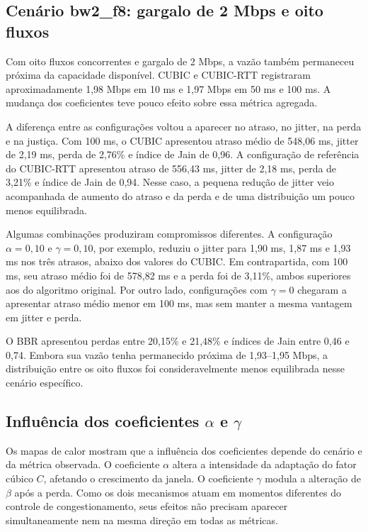 \subsection{Cenário bw2\_f8: gargalo de 2 Mbps e oito fluxos}

Com oito fluxos concorrentes e gargalo de 2 Mbps, a vazão também permaneceu próxima da capacidade disponível. CUBIC e CUBIC-RTT registraram aproximadamente 1,98 Mbps em 10 ms e 1,97 Mbps em 50 ms e 100 ms. A mudança dos coeficientes teve pouco efeito sobre essa métrica agregada.

A diferença entre as configurações voltou a aparecer no atraso, no jitter, na perda e na justiça. Com 100 ms, o CUBIC apresentou atraso médio de 548,06 ms, jitter de 2,19 ms, perda de 2,76\% e índice de Jain de 0,96. A configuração de referência do CUBIC-RTT apresentou atraso de 556,43 ms, jitter de 2,18 ms, perda de 3,21\% e índice de Jain de 0,94. Nesse caso, a pequena redução de jitter veio acompanhada de aumento do atraso e da perda e de uma distribuição um pouco menos equilibrada.

Algumas combinações produziram compromissos diferentes. A configuração $\alpha=0{,}10$ e $\gamma=0{,}10$, por exemplo, reduziu o jitter para 1,90 ms, 1,87 ms e 1,93 ms nos três atrasos, abaixo dos valores do CUBIC. Em contrapartida, com 100 ms, seu atraso médio foi de 578,82 ms e a perda foi de 3,11\%, ambos superiores aos do algoritmo original. Por outro lado, configurações com $\gamma=0$ chegaram a apresentar atraso médio menor em 100 ms, mas sem manter a mesma vantagem em jitter e perda.

O BBR apresentou perdas entre 20,15\% e 21,48\% e índices de Jain entre 0,46 e 0,74. Embora sua vazão tenha permanecido próxima de 1,93--1,95 Mbps, a distribuição entre os oito fluxos foi consideravelmente menos equilibrada nesse cenário específico.

\subsection{Influência dos coeficientes \texorpdfstring{$\alpha$ e $\gamma$}{alpha e gamma}}

Os mapas de calor mostram que a influência dos coeficientes depende do cenário e da métrica observada. O coeficiente $\alpha$ altera a intensidade da adaptação do fator cúbico $C$, afetando o crescimento da janela. O coeficiente $\gamma$ modula a alteração de $\beta$ após a perda. Como os dois mecanismos atuam em momentos diferentes do controle de congestionamento, seus efeitos não precisam aparecer simultaneamente nem na mesma direção em todas as métricas.

